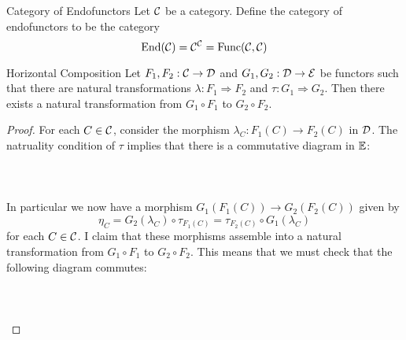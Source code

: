 \documentclass[a4paper]{article}
\begin{document}
\begin{defn}{Category of Endofunctors}{} Let $\mathcal{C}$ be a category. Define the category of endofunctors to be the category $$\text{End}(\mathcal{C})=\mathcal{C}^{\mathcal{C}}=\text{Func}(\mathcal{C},\mathcal{C})$$
\end{defn}

\begin{prp}{Horizontal Composition}{} Let $F_1,F_2:\mathcal{C}\to\mathcal{D}$ and $G_1,G_2:\mathcal{D}\to\mathcal{E}$ be functors such that there are natural transformations $\lambda:F_1\Rightarrow F_2$ and $\tau:G_1\Rightarrow G_2$. Then there exists a natural transformation from $G_1\circ F_1$ to $G_2\circ F_2$. \tcbline
\begin{proof}
For each $C\in\mathcal{C}$, consider the morphism $\lambda_C:F_1(C)\to F_2(C)$ in $\mathcal{D}$. The natruality condition of $\tau$ implies that there is a commutative diagram in $\mathbb{E}$: \\~\\
\\~\\
In particular we now have a morphism $G_1(F_1(C))\to G_2(F_2(C))$ given by $$\eta_C=G_2(\lambda_C)\circ\tau_{F_1(C)}=\tau_{F_2(C)}\circ G_1(\lambda_C)$$ for each $C\in\mathcal{C}$. I claim that these morphisms assemble into a natural transformation from $G_1\circ F_1$ to $G_2\circ F_2$. This means that we must check that the following diagram commutes: \\~\\
\\~\\

\end{proof}
\end{prp}
\end{document}

